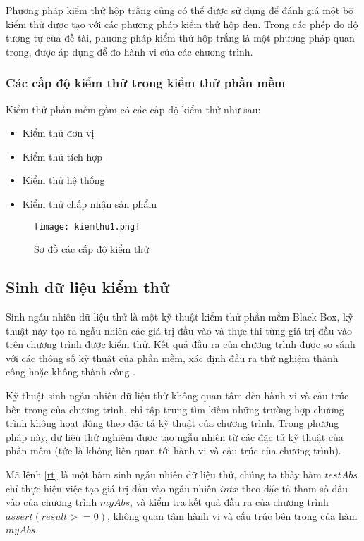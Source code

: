 Phương pháp kiểm thử hộp trắng cũng có thể được sử dụng để đánh giá một bộ kiểm thử được tạo với các phương pháp kiểm thử hộp đen. Trong các phép đo độ tương tự của đề tài, phương pháp kiểm thử hộp trắng là một phương pháp quan trọng, được áp dụng để đo hành vi của các chương trình.
	
\subsubsection{Các cấp độ kiểm thử trong kiểm thử phần mềm}
Kiểm thử phần mềm gồm có các cấp độ kiểm thử như sau:
\begin{itemize}
	\item Kiểm thử đơn vị
	\item Kiểm thử tích hợp
	\item Kiểm thử hệ thống
	\item Kiểm thử chấp nhận sản phẩm
\end{itemize}
	
\begin{center}
	\begin{figure}[h]
		\begin{center}
			\texttt{[image: kiemthu1.png]}
		\end{center}
		\caption{Sơ đồ các cấp độ kiểm thử}		
	\end{figure}
\end{center}

\subsection{Sinh dữ liệu kiểm thử}
Sinh ngẫu nhiên dữ liệu thử là một kỹ thuật kiểm thử phần mềm Black-Box, kỹ thuật này tạo ra ngẫu nhiên các giá trị đầu vào và thực thi từng giá trị đầu vào trên chương trình được kiểm thử. Kết quả đầu ra của chương trình được so sánh với các thông số kỹ thuật của phần mềm, xác định đầu ra thử nghiệm thành công hoặc không thành công \cite{myers2011art}.  

Kỹ thuật sinh ngẫu nhiên dữ liệu thử không quan tâm đến hành vi và cấu trúc bên trong của chương trình, chỉ tập trung tìm kiếm những trường hợp chương trình không hoạt động theo đặc tả kỹ thuật của chương trình. Trong phương pháp này, dữ liệu thử nghiệm được tạo ngẫu nhiên từ các đặc tả kỹ thuật của phần mềm (tức là không liên quan tới hành vi và cấu trúc của chương trình).


Mã lệnh \ref{rt} là một hàm sinh ngẫu nhiên dữ liệu thử, chúng ta thấy hàm $testAbs$ chỉ thực hiện việc tạo giá trị đầu vào ngẫu nhiên $int x$ theo đặc tả tham số đầu vào của chương trình $myAbs$, và kiểm tra kết quả đầu ra của chương trình $assert(result >= 0)$, không quan tâm hành vi và cấu trúc bên trong của hàm $myAbs$.

